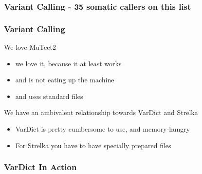 \documentclass{beamer}
\begin{document}
\begin{frame}
\frametitle{Variant Calling - 35 somatic callers on this list}
\end{frame}

\begin{frame}
\frametitle{Variant Calling}
\begin{block}{We love MuTect2}
	\begin{itemize}
		\item we love it, because it at least works
		\item and is not eating up the machine
		\item and uses standard files
	\end{itemize}
\end{block}
\begin{block}{We have an ambivalent relationship towards VarDict and Strelka}
	\begin{itemize}
		\item VarDict is pretty cumbersome to use, and memory-hungry
		\item For Strelka you have to have specially prepared files
	\end{itemize}
\end{block}
\end{frame}

\begin{frame}
\frametitle{VarDict In Action}
\end{frame}
\end{document}
